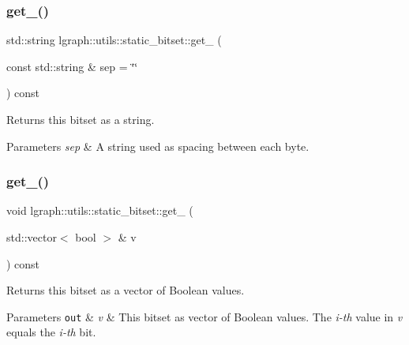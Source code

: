 \subsubsection{\texorpdfstring{get\+\_()}{get\_01()}\hspace{0.1cm}{\footnotesize\ttfamily [2/4]}}
{\footnotesize\ttfamily std\+::string lgraph\+::utils\+::static\+\_\+bitset\+::get\+\_ (\begin{DoxyParamCaption}\item[{const std\+::string \&}]{sep = {\ttfamily \char`\"{}\char`\"{}} }\end{DoxyParamCaption}) const}



Returns this bitset as a string. 


\begin{DoxyParams}{Parameters}
{\em sep} & A string used as spacing between each byte. \\
\hline
\end{DoxyParams}
\mbox{\label{classlgraph_1_1utils_1_1static__bitset_a37b11e14da1369678b7d862da959c988}} 
\subsubsection{\texorpdfstring{get\+\_()}{get\_01()}\hspace{0.1cm}{\footnotesize\ttfamily [3/4]}}
{\footnotesize\ttfamily void lgraph\+::utils\+::static\+\_\+bitset\+::get\+\_ (\begin{DoxyParamCaption}\item[{std\+::vector$<$ bool $>$ \&}]{v }\end{DoxyParamCaption}) const}



Returns this bitset as a vector of Boolean values. 


\begin{DoxyParams}[1]{Parameters}
\mbox{\tt out}  & {\em v} & This bitset as vector of Boolean values. The {\itshape i-\/th} value in {\itshape v} equals the {\itshape i-\/th} bit. \\
\hline
\end{DoxyParams}
\mbox{\label{classlgraph_1_1utils_1_1static__bitset_a51f45c5c6bbe8788d4d6c58695a19d49}} 
